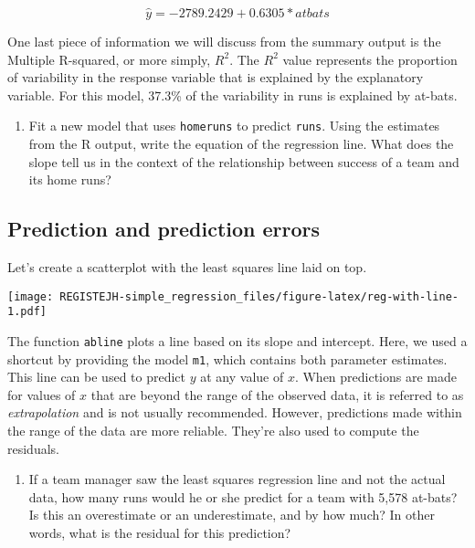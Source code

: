 \documentclass[
]{article}
\newenvironment{Shaded}{\begin{snugshade}}{\end{snugshade}}
\newcommand{\KeywordTok}[1]{\textcolor[rgb]{0.13,0.29,0.53}{\textbf{#1}}}
\newcommand{\NormalTok}[1]{#1}
\newcommand{\OperatorTok}[1]{\textcolor[rgb]{0.81,0.36,0.00}{\textbf{#1}}}
\newcommand{\StringTok}[1]{\textcolor[rgb]{0.31,0.60,0.02}{#1}}
\providecommand{\tightlist}{%
  \setlength{\itemsep}{0pt}\setlength{\parskip}{0pt}}
\begin{document}
\[
  \hat{y} = -2789.2429 + 0.6305 * atbats
\]

One last piece of information we will discuss from the summary output is
the Multiple R-squared, or more simply, \(R^2\). The \(R^2\) value
represents the proportion of variability in the response variable that
is explained by the explanatory variable. For this model, 37.3\% of the
variability in runs is explained by at-bats.

\begin{enumerate}
\def\labelenumi{\arabic{enumi}.}
\setcounter{enumi}{3}
\tightlist
\item
  Fit a new model that uses \texttt{homeruns} to predict \texttt{runs}.
  Using the estimates from the R output, write the equation of the
  regression line. What does the slope tell us in the context of the
  relationship between success of a team and its home runs?
\end{enumerate}

\hypertarget{prediction-and-prediction-errors}{%
\subsection{Prediction and prediction
errors}\label{prediction-and-prediction-errors}}

Let's create a scatterplot with the least squares line laid on top.

\begin{Shaded}
\end{Shaded}

\texttt{[image: REGISTEJH-simple\_regression\_files/figure-latex/reg-with-line-1.pdf]}

The function \texttt{abline} plots a line based on its slope and
intercept. Here, we used a shortcut by providing the model \texttt{m1},
which contains both parameter estimates. This line can be used to
predict \(y\) at any value of \(x\). When predictions are made for
values of \(x\) that are beyond the range of the observed data, it is
referred to as \emph{extrapolation} and is not usually recommended.
However, predictions made within the range of the data are more
reliable. They're also used to compute the residuals.

\begin{enumerate}
\def\labelenumi{\arabic{enumi}.}
\setcounter{enumi}{4}
\tightlist
\item
  If a team manager saw the least squares regression line and not the
  actual data, how many runs would he or she predict for a team with
  5,578 at-bats? Is this an overestimate or an underestimate, and by how
  much? In other words, what is the residual for this prediction?
\end{enumerate}
\end{document}
